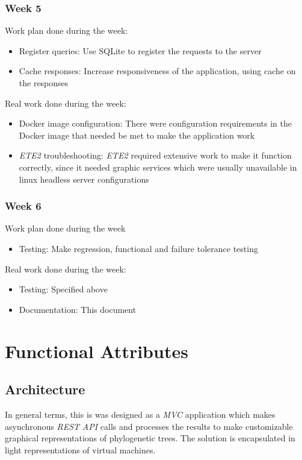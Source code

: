 \documentclass[10pt]{article}
\begin{document}
  \subsubsection{Week 5}
  	Work plan done during the week:
  	\begin{itemize}
  		\item Register queries: Use SQLite to register the requests to the server
  		\item Cache responses: Increase responsiveness of the application, using cache on the responses
	\end{itemize}
	Real work done during the week:
	\begin{itemize}
		\item Docker image configuration: There were configuration requirements in the Docker image that needed be met to make the application work
		\item \textit{ETE2} troubleshooting: \textit{ETE2} required extensive work to make it function correctly, since it needed graphic services which were usually unavailable in linux headless server configurations
	\end{itemize}
  \subsubsection{Week 6}
  	Work plan done during the week
  	\begin{itemize}
  		\item Testing: Make regression, functional and failure tolerance testing
	\end{itemize}
	Real work done during the week:
	\begin{itemize}
		\item Testing: Specified above
		\item Documentation: This document
	\end{itemize}

\section{Functional Attributes}
 \subsection{Architecture}
 In general terms, this is was designed as a \textit{MVC} application which makes asynchronous \textit{REST} \textit{API} calls and processes the results to make customizable graphical representations of phylogenetic trees. The solution is encapsulated in light representations of virtual machines.
 
\end{document}
